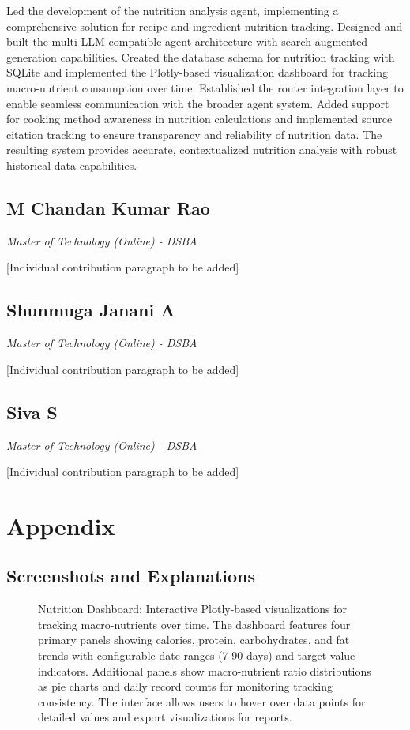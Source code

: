 \documentclass{ecai}
\begin{document}
Led the development of the nutrition analysis agent, implementing a comprehensive solution for recipe and ingredient nutrition tracking. Designed and built the multi-LLM compatible agent architecture with search-augmented generation capabilities. Created the database schema for nutrition tracking with SQLite and implemented the Plotly-based visualization dashboard for tracking macro-nutrient consumption over time. Established the router integration layer to enable seamless communication with the broader agent system. Added support for cooking method awareness in nutrition calculations and implemented source citation tracking to ensure transparency and reliability of nutrition data. The resulting system provides accurate, contextualized nutrition analysis with robust historical data capabilities.

\subsection*{M Chandan Kumar Rao}
\textit{Master of Technology (Online) - DSBA}

[Individual contribution paragraph to be added]

\subsection*{Shunmuga Janani A}
\textit{Master of Technology (Online) - DSBA}

[Individual contribution paragraph to be added]

\subsection*{Siva S}
\textit{Master of Technology (Online) - DSBA}

[Individual contribution paragraph to be added]

\clearpage
\section*{Appendix}

\subsection*{Screenshots and Explanations}

\begin{figure}[h]
\centering
{}
\caption{Nutrition Dashboard: Interactive Plotly-based visualizations for tracking macro-nutrients over time. The dashboard features four primary panels showing calories, protein, carbohydrates, and fat trends with configurable date ranges (7-90 days) and target value indicators. Additional panels show macro-nutrient ratio distributions as pie charts and daily record counts for monitoring tracking consistency. The interface allows users to hover over data points for detailed values and export visualizations for reports.}
\end{figure}
\end{document}
